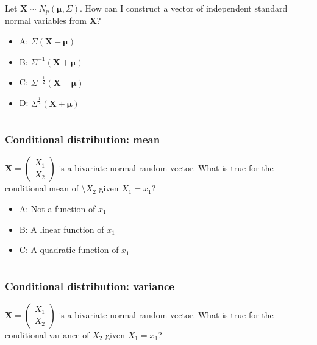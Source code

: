 \documentclass[]{article}
\providecommand{\tightlist}{%
  \setlength{\itemsep}{0pt}\setlength{\parskip}{0pt}}
\begin{document}
Let \(\mathbf{X}\sim N_p(\mathbf{\mu},\Sigma)\). How can I construct a
vector of independent standard normal variables from \(\mathbf{X}\)?

\begin{itemize}
\tightlist
\item
  A: \(\Sigma(\mathbf{X}-\mathbf{\mu})\)
\item
  B: \(\Sigma^{-1}(\mathbf{X}+\mathbf{\mu})\)
\item
  C: \(\Sigma^{-\frac{1}{2}}(\mathbf{X}-\mathbf{\mu})\)
\item
  D: \(\Sigma^{\frac{1}{2}}(\mathbf{X}+\mathbf{\mu})\)
\end{itemize}

\begin{center}\rule{0.5\linewidth}{\linethickness}\end{center}

\hypertarget{conditional-distribution-mean}{%
\subsubsection{Conditional distribution:
mean}\label{conditional-distribution-mean}}

\(\mathbf{X}=\left(\begin{array}{r}X_1 \\X_2 \end{array}\right)\) is a
bivariate normal random vector. What is true for the conditional mean of
\textbackslash{}\(X_2\) given \(X_1=x_1\)?

\begin{itemize}
\tightlist
\item
  A: Not a function of \(x_1\)
\item
  B: A linear function of \(x_1\)
\item
  C: A quadratic function of \(x_1\)
\end{itemize}

\begin{center}\rule{0.5\linewidth}{\linethickness}\end{center}

\hypertarget{conditional-distribution-variance}{%
\subsubsection{Conditional distribution:
variance}\label{conditional-distribution-variance}}

\(\mathbf{X}=\left(\begin{array}{r}X_1 \\X_2 \end{array}\right)\) is a
bivariate normal random vector. What is true for the conditional
variance of \(X_2\) given \(X_1=x_1\)?
\end{document}
